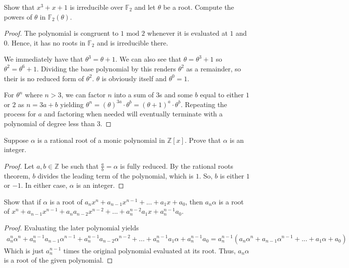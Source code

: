 \documentclass[10pt]{article}
\newcommand{\Z}{\mathbb{Z}}
\newenvironment{problem}[2][Problem]{\begin{trivlist}
		\item[\hskip \labelsep {\bfseries #1}\hskip \labelsep {\bfseries #2.}]}{\end{trivlist}}
\begin{document}
	\begin{problem}{1.3}
		Show that $x^3 + x + 1$ is irreducible over $\mathbb{F}_2$ and let $\theta$ be a root. Compute the powers of $\theta$ in $\mathbb{F}_2(\theta)$.
		\begin{proof}
			The polynomial is congruent to $1 \text{ mod }2$ whenever it is evaluated at $1$ and $0$. Hence, it has no roots in $\mathbb{F}_2$ and is irreducible there.
			
			We immediately have that $\theta^3 = \theta+1$. We can also see that $\theta = \theta^3+1$ so $\theta^2 = \theta^6 + 1$. Dividing the base polynomial by this renders $\theta^2$ as a remainder, so their is no reduced form of $\theta^2$. $\theta$ is obviously itself and $\theta^0=1$.
			
			For $\theta^n$ where $n>3$, we can factor $n$ into a sum of  $3$s and some $b$ equal to either $1$ or $2$ as $n=3a+b$ yielding $\theta^n = (\theta)^{3a} \cdot \theta^b = (\theta+1)^a\cdot\theta^b$. Repeating the process for $a$ and factoring when needed will eventually terminate with a polynomial of degree less than $3$.
		\end{proof}
	\end{problem}
	
	\begin{problem}{1.5}
		Suppose $\alpha$ is a rational root of a monic polynomial in $\Z[x]$. Prove that $\alpha$ is an integer.
		\begin{proof}
			Let $a,b \in \Z$ be such that $\frac{a}{b} =\alpha$ is fully reduced. By the rational roots theorem, $b$ divides the leading term of the polynomial, which is $1$. So, $b$ is either $1$ or $-1$. In either case, $\alpha$ is an integer.
		\end{proof}
	\end{problem}
	
	\begin{problem}{1.6}
		Show that if $\alpha$ is a root of $a_nx^n + a_{n-1}x^{n-1} + ... + a_1x + a_0$, then $a_n\alpha$ is a root of $x^n + a_{n-1}x^{n-1} + a_na_{n-2}x^{n-2} + ... + a_n^{n-2}a_1x + a_n^{n-1}a_0$.
		\begin{proof}
			Evaluating the later polynomial yields
			\begin{align*}
				a_n^n \alpha^n + a_n^{n-1}a_{n-1}\alpha^{n-1} + a_n^{n-1}a_{n-2}\alpha^{n-2} + ... + a_n^{n-1}a_1\alpha + a_n^{n-1}a_0 = a_n^{n-1}(a_n\alpha^n + a_{n-1}\alpha^{n-1} + ... + a_1\alpha + a_0) 
			\end{align*}
			Which is just $a_n^{n-1}$ times the original polynomial evaluated at its root. Thus, $a_n\alpha$ is a root of the given polynomial.
		\end{proof}
	\end{problem}
	
\end{document}
